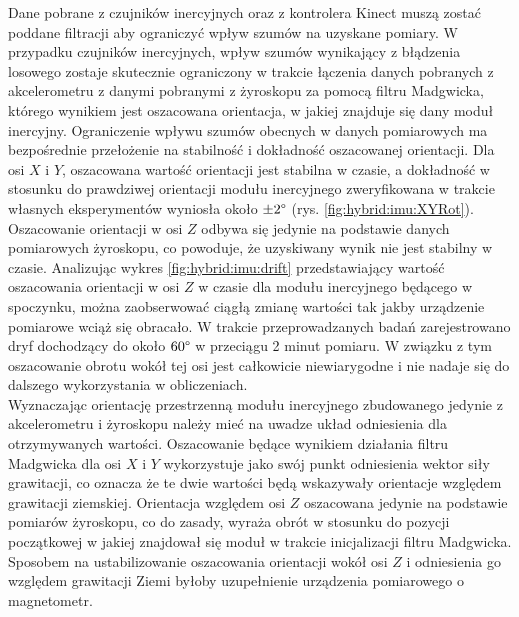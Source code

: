 Dane pobrane z czujników inercyjnych oraz z kontrolera Kinect muszą zostać poddane filtracji aby ograniczyć wpływ szumów na uzyskane pomiary. W przypadku czujników inercyjnych, wpływ szumów wynikający z błądzenia losowego zostaje skutecznie ograniczony w trakcie łączenia danych pobranych z akcelerometru z danymi pobranymi z żyroskopu za pomocą filtru Madgwicka, którego wynikiem jest oszacowana orientacja, w jakiej znajduje się dany moduł inercyjny. Ograniczenie wpływu szumów obecnych w danych pomiarowych ma bezpośrednie przełożenie na stabilność i dokładność oszacowanej orientacji. Dla osi $X$ i $Y$, oszacowana wartość orientacji jest stabilna w czasie, a dokładność w stosunku do prawdziwej orientacji modułu inercyjnego zweryfikowana w trakcie własnych eksperymentów wyniosła około $\pm 2\degree$ (rys. \ref{fig:hybrid:imu:XYRot}).
Oszacowanie orientacji w osi $Z$ odbywa się jedynie na podstawie danych pomiarowych żyroskopu, co powoduje, że uzyskiwany wynik nie jest stabilny w czasie. Analizując wykres \ref{fig:hybrid:imu:drift}
przedstawiający wartość oszacowania orientacji w osi $Z$ w czasie dla modułu inercyjnego będącego w spoczynku, można zaobserwować ciągłą zmianę wartości tak jakby urządzenie pomiarowe wciąż się obracało. W trakcie przeprowadzanych badań zarejestrowano dryf dochodzący do około $60\degree$ w przeciągu 2 minut pomiaru. W związku z tym oszacowanie obrotu wokół tej osi jest całkowicie niewiarygodne i nie nadaje się do dalszego wykorzystania w obliczeniach. \\
Wyznaczając orientację przestrzenną modułu inercyjnego zbudowanego jedynie z akcelerometru i żyroskopu należy mieć na uwadze układ odniesienia dla otrzymywanych wartości. Oszacowanie będące wynikiem działania filtru Madgwicka dla osi $X$ i $Y$ wykorzystuje jako swój punkt odniesienia wektor siły grawitacji, co oznacza że te dwie wartości będą wskazywały orientacje względem grawitacji ziemskiej. Orientacja względem osi $Z$ oszacowana jedynie na podstawie pomiarów żyroskopu, co do zasady, wyraża obrót w stosunku do pozycji początkowej w jakiej znajdował się moduł w trakcie inicjalizacji filtru Madgwicka. Sposobem na ustabilizowanie oszacowania orientacji wokół osi $Z$ i odniesienia go względem grawitacji Ziemi byłoby uzupełnienie urządzenia pomiarowego o magnetometr. \\

